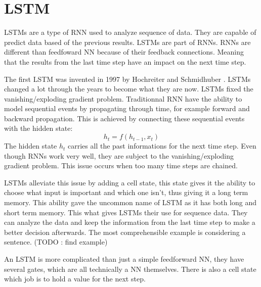 \section{\acs{LSTM}}\label{sec:lstm}
\acp{LSTM} are a type of \ac{RNN} used to analyze sequence of data. They are capable of predict data based of the previous results. \acp{LSTM} are part of \acp{RNN}. \acp{RNN} are different than feedfoward \acl{NN} because of their feedback connections. Meaning that the results from the last time step have an impact on the next time step.

The first \ac{LSTM} was invented in 1997 by Hochreiter and Schmidhuber \cite{firstLSTM}. \acp{LSTM} changed a lot through the years to become what they are now.
\acp{LSTM} fixed the vanishing/exploding gradient problem. Traditionnal \ac{RNN} have the ability to model sequential events by propagating through time, for example forward and backward propagation. This is achieved by connecting these sequential events with the hidden state:
$$h_t=f(h_{t-1},x_t)$$
The hidden state $h_t$ carries all the past informations for the next time step.
Even though \acp{RNN} work very well, they are subject to the vanishing/exploding gradient problem. This issue occurs when too many time steps are chained.

\acp{LSTM} alleviate this issue by adding a cell state, this state gives it the ability to choose what input is important and which one isn't, thus giving it a long term memory. This ability gave the uncommon name of \acl{LSTM} as it has both long and short term memory. This what gives \acp{LSTM} their use for sequence data. They can analyze the data and keep the information from the last time step to make a better decision afterwards. The most comprehensible example is considering a sentence. (TODO : find example)

An \ac{LSTM} is more complicated than just a simple feedforward \acl{NN}, they have several gates, which are all technically a \ac{NN} themselves. There is also a cell state which job is to hold a value for the next step.

\begin{figure}[H]
  \centering
  \begin{minipage}{\columnwidth}
  \end{minipage}
  \begin{minipage}{\columnwidth}
  \end{minipage}
  \caption{}
\end{figure}

